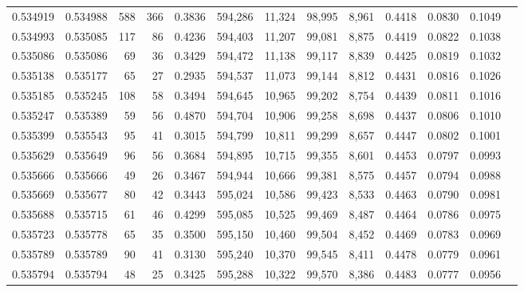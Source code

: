 \begin{tabular}{rrrrrrrrrrrrr}
0.534919 & 0.534988 &   588 &   366 &                                     0.3836 & 594,286 &  11,324 &  98,995 &   8,961 & 0.4418 & 0.0830 & 0.1049 \\
0.534993 & 0.535085 &   117 &    86 &                                     0.4236 & 594,403 &  11,207 &  99,081 &   8,875 & 0.4419 & 0.0822 & 0.1038 \\
0.535086 & 0.535086 &    69 &    36 &                                     0.3429 & 594,472 &  11,138 &  99,117 &   8,839 & 0.4425 & 0.0819 & 0.1032 \\
0.535138 & 0.535177 &    65 &    27 &                                     0.2935 & 594,537 &  11,073 &  99,144 &   8,812 & 0.4431 & 0.0816 & 0.1026 \\
0.535185 & 0.535245 &   108 &    58 &                                     0.3494 & 594,645 &  10,965 &  99,202 &   8,754 & 0.4439 & 0.0811 & 0.1016 \\
0.535247 & 0.535389 &    59 &    56 &                                     0.4870 & 594,704 &  10,906 &  99,258 &   8,698 & 0.4437 & 0.0806 & 0.1010 \\
0.535399 & 0.535543 &    95 &    41 &                                     0.3015 & 594,799 &  10,811 &  99,299 &   8,657 & 0.4447 & 0.0802 & 0.1001 \\
0.535629 & 0.535649 &    96 &    56 &                                     0.3684 & 594,895 &  10,715 &  99,355 &   8,601 & 0.4453 & 0.0797 & 0.0993 \\
0.535666 & 0.535666 &    49 &    26 &                                     0.3467 & 594,944 &  10,666 &  99,381 &   8,575 & 0.4457 & 0.0794 & 0.0988 \\
0.535669 & 0.535677 &    80 &    42 &                                     0.3443 & 595,024 &  10,586 &  99,423 &   8,533 & 0.4463 & 0.0790 & 0.0981 \\
0.535688 & 0.535715 &    61 &    46 &                                     0.4299 & 595,085 &  10,525 &  99,469 &   8,487 & 0.4464 & 0.0786 & 0.0975 \\
0.535723 & 0.535778 &    65 &    35 &                                     0.3500 & 595,150 &  10,460 &  99,504 &   8,452 & 0.4469 & 0.0783 & 0.0969 \\
0.535789 & 0.535789 &    90 &    41 &                                     0.3130 & 595,240 &  10,370 &  99,545 &   8,411 & 0.4478 & 0.0779 & 0.0961 \\
0.535794 & 0.535794 &    48 &    25 &                                     0.3425 & 595,288 &  10,322 &  99,570 &   8,386 & 0.4483 & 0.0777 & 0.0956 \\

\end{tabular}
